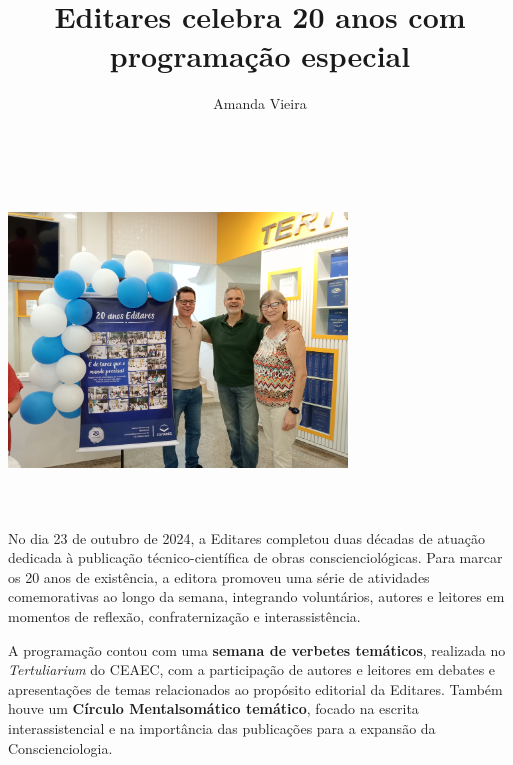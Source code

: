 \documentclass{gescons}
\author{Amanda Vieira}
\title{Editares celebra 20 anos com programação especial}
\begin{document}
    \makeentrevistatitle


    
    \begin{multicols}{2}


\textbf{}

\noindent\includegraphics[width=9cm, height=9cm]{articles/resumo/fotos/materia1/IMG20241023144802.jpg}


No dia 23 de outubro de 2024, a Editares completou duas décadas de atuação dedicada à publicação técnico-científica de obras conscienciológicas. Para marcar os 20 anos de existência, a editora promoveu uma série de atividades comemorativas ao longo da semana, integrando voluntários, autores e leitores em momentos de reflexão, confraternização e interassistência.

A programação contou com uma \textbf{semana de verbetes temáticos}, realizada no \emph{Tertuliarium} do CEAEC, com a participação de autores e leitores em debates e apresentações de temas relacionados ao propósito editorial da Editares. Também houve um \textbf{Círculo Mentalsomático temático}, focado na escrita interassistencial e na importância das publicações para a expansão da Conscienciologia.


\end{multicols}
\end{document}
